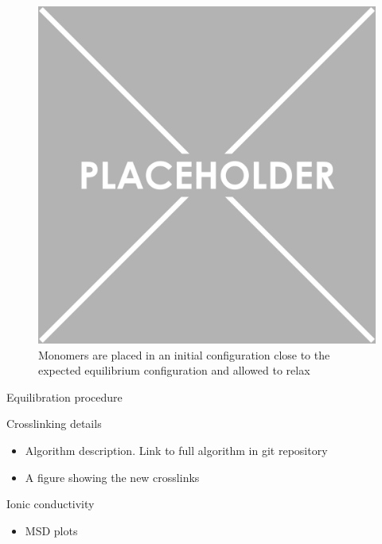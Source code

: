 \documentclass{article}
\begin{document}
        \begin{figure}
		\centering
		\includegraphics{placeholder.png}
                \caption{Monomers are placed in an initial configuration close to the expected equilibrium configuration and allowed to relax}
                \label{fig:initial}
        \end{figure}

	Equilibration procedure

	\noindent Crosslinking details
	\begin{itemize}
		\item Algorithm description. Link to full algorithm in git repository
		\item A figure showing the new crosslinks
	\end{itemize}
	
	\noindent Ionic conductivity %
	\begin{itemize}
		\item MSD plots
	\end{itemize}
\end{document}
